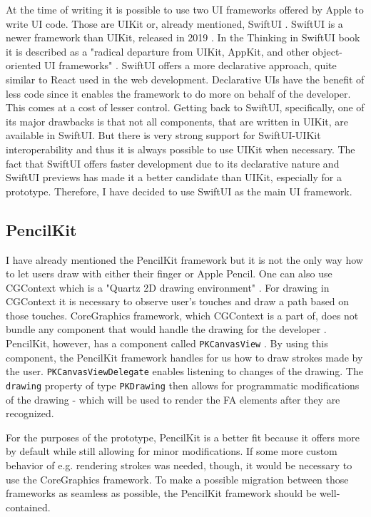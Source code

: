 At the time of writing it is possible to use two UI frameworks offered by Apple to write UI code. Those are UIKit \cite{uikit} or, already mentioned, SwiftUI \cite{swiftui}. SwiftUI is a newer framework than UIKit, released in 2019 \cite{swiftui-release}. In the Thinking in SwiftUI book it is described as a "radical departure from UIKit, AppKit, and other object-oriented UI frameworks" \cite{thinking-in-swiftui}. SwiftUI offers a more declarative approach, quite similar to React \cite{react} used in the web development. Declarative UIs have the benefit of less code since it enables the framework to do more on behalf of the developer. This comes at a cost of lesser control. Getting back to SwiftUI, specifically, one of its major drawbacks is that not all components, that are written in UIKit, are available in SwiftUI. But there is very strong support for SwiftUI-UIKit interoperability \cite{swiftui-interop} and thus it is always possible to use UIKit when necessary. The fact that SwiftUI offers faster development due to its declarative nature and SwiftUI previews \cite{swiftui-preview} has made it a better candidate than UIKit, especially for a prototype. Therefore, I have decided to use SwiftUI as the main UI framework.

\subsection{PencilKit}

I have already mentioned the PencilKit framework but it is not the only way how to let users draw with either their finger or Apple Pencil. One can also use CGContext which is a "Quartz 2D drawing environment" \cite{cgcontext}. For drawing in CGContext it is necessary to observe user's touches and draw a path based on those touches. CoreGraphics framework, which CGContext is a part of, does not bundle any component that would handle the drawing for the developer \cite{coregraphics}. PencilKit, however, has a component called \lstinline{PKCanvasView} \cite{pkcanvasview}. By using this component, the PencilKit framework handles for us how to draw strokes made by the user. \lstinline{PKCanvasViewDelegate} enables listening to changes of the drawing. The \lstinline{drawing} property of type \lstinline{PKDrawing} then allows for programmatic modifications of the drawing - which will be used to render the FA elements after they are recognized.

For the purposes of the prototype, PencilKit is a better fit because it offers more by default while still allowing for minor modifications. If some more custom behavior of e.g. rendering strokes was needed, though, it would be necessary to use the CoreGraphics framework. To make a possible migration between those frameworks as seamless as possible, the PencilKit framework should be well-contained.

